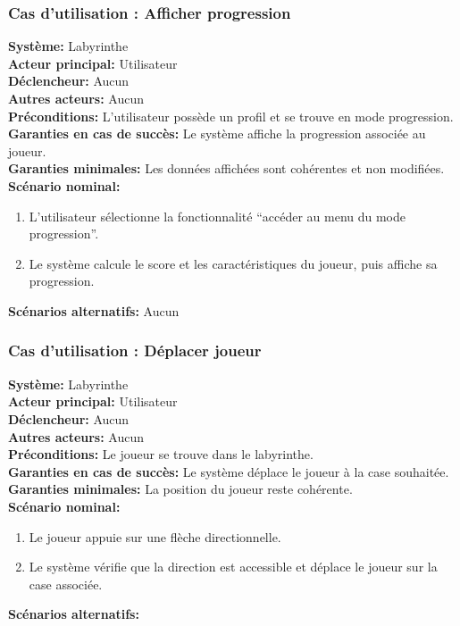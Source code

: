 \documentclass{butexFR}
\begin{document}
\subsubsection{Cas d'utilisation : Afficher progression}
\textbf{Système:} Labyrinthe\\
\textbf{Acteur principal:} Utilisateur\\
\textbf{Déclencheur:} Aucun\\
\textbf{Autres acteurs:} Aucun\\
\textbf{Préconditions:} L'utilisateur possède un profil et se trouve en mode progression.\\
\textbf{Garanties en cas de succès:} Le système affiche la progression associée au joueur.\\
\textbf{Garanties minimales:} Les données affichées sont cohérentes et non modifiées.\\
\textbf{Scénario nominal:}
\begin{enumerate}
    \item L'utilisateur sélectionne la fonctionnalité ``accéder au menu du mode progression''.
    \item Le système calcule le score et les caractéristiques du joueur, puis affiche sa progression.
\end{enumerate}
\textbf{Scénarios alternatifs:} Aucun

\newpage

\subsubsection{Cas d'utilisation : Déplacer joueur}
\textbf{Système:} Labyrinthe\\
\textbf{Acteur principal:} Utilisateur\\
\textbf{Déclencheur:} Aucun\\
\textbf{Autres acteurs:} Aucun\\
\textbf{Préconditions:} Le joueur se trouve dans le labyrinthe.\\
\textbf{Garanties en cas de succès:} Le système déplace le joueur à la case souhaitée.\\
\textbf{Garanties minimales:} La position du joueur reste cohérente.\\
\textbf{Scénario nominal:}
\begin{enumerate}
    \item Le joueur appuie sur une flèche directionnelle.
    \item Le système vérifie que la direction est accessible et déplace le joueur sur la case associée.
\end{enumerate}
\textbf{Scénarios alternatifs:}
\end{document}
